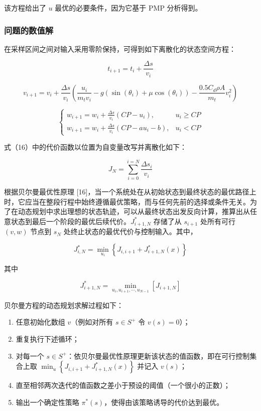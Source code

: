 \documentclass[11pt,a4paper]{ctexart}
\begin{document}
该方程给出了 $u$ 最优的必要条件，因为它基于 PMP 分析得到。

\subsubsection{问题的数值解}

在采样区间之间对输入采用零阶保持，可得到如下离散化的状态空间方程：

\[
t_{i+1}=t_i+\frac{\Delta s}{v_i}
\]

\[
v_{i+1}=v_i+\frac{\Delta s}{v_i}\left(\frac{u_i}{m_t v_i}-g\left(\sin(\theta_i)+\mu\cos(\theta_i)\right)-\frac{0.5C_d\rho A}{m_t}v_i^{2}\right)
\]

\[
\left\{\begin{array}{ll}w_{i+1}=w_i+\frac{\Delta s}{v_i}\left(CP-u_i\right), & u_i\geq CP\\[0.6em] w_{i+1}=w_i+\frac{\Delta s}{v_i}\left(CP-au_i-b\right), & u_i<CP\end{array}\right.
\]

式（16）中的代价函数以位置为自变量改写并离散化如下：

\[
J_N=\sum_{i=0}^{i=N}\frac{\Delta s_i}{v_i}
\]

根据贝尔曼最优性原理 [16]，当一个系统处在从初始状态到最终状态的最优路径上时，它应当在整段行程中始终遵循最优策略，而与任何先前的选择或条件无关。为了在动态规划中求出理想的状态轨迹，可以从最终状态出发反向计算，推算出从任意状态到最后一个阶段的最优后续代价。$J^{*}_{i+1,N}$ 存储了从 $s_{i+1}$ 处所有可行 $(v,w)$ 节点到 $s_N$ 处终止状态的最优代价与控制输入。其中，

\[
J^{*}_{i,N}=\min_{u_i}\left\{J_{i,i+1}+J^{*}_{i+1,N}(x)\right\}
\]

其中

\[
J^{*}_{i+1,N}=\min_{u_i,u_{i+1},\cdots,u_{N-1}}\left[J_{i+1,N}\right]
\]

贝尔曼方程的动态规划求解过程如下：

\begin{enumerate}
\item 任意初始化数组 $v$（例如对所有 $s\in S^{+}$ 令 $v(s)=0$）；
\item 重复执行下述循环；
\item 对每一个 $s\in S^{+}$：依贝尔曼最优性原理更新该状态的值函数，即在可行控制集合上取 $\min_{u}\left\{J_{i,i+1}+J^{*}_{i+1,N}(x)\right\}$ 并记入 $v(s)$；
\item 直至相邻两次迭代的值函数之差小于预设的阈值（一个很小的正数）；
\item 输出一个确定性策略 $\pi^{*}(s)$，使得由该策略诱导的代价达到最优。
\end{enumerate}
\end{document}
